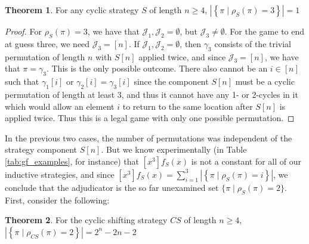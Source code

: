 \documentclass[article]{amsart}
\theoremstyle{definition}
\newtheorem{theorem}{Theorem}[section]
\theoremstyle{definition}
\theoremstyle{remark}
\begin{document}
\begin{theorem} \label{thm:rho3}
    For any cyclic strategy $S$ of length $n \geq 4$, $\left| \left\{ \pi \mid \rho_S(\pi) = 3 \right\} \right| = 1 $
\end{theorem}

\begin{proof}
For $\rho_S(\pi) = 3$, we have that $\mathcal{J}_1, \mathcal{J}_2 = \emptyset$, but $\mathcal{J}_3 \neq \emptyset$. For the game to end at guess three, we need $\mathcal{J}_3 = [n]$. If $\mathcal{J}_1, \mathcal{J}_2 = \emptyset$, then $\gamma_3$ consists of the trivial permutation of length $n$ with $S[n]$ applied twice, and since $\mathcal{J}_3 = [n]$, we have that $\pi = \gamma_3$. This is the only possible outcome. There also cannot be an $i \in [n]$ such that $\gamma_1[i]$ or $\gamma_2[i] = \gamma_3[i]$ since the component $S[n]$ must be a cyclic permutation of length at least 3, and thus it cannot have any 1- or 2-cycles in it which would allow an element $i$ to return to the same location after $S[n]$ is applied twice. Thus this is a legal game with only one possible permutation.
\end{proof}

In the previous two cases, the number of permutations was independent of the strategy component $S[n]$. But we know experimentally (in Table \ref{tab:gf_examples}, for instance) that $[x^3]f_S(x)$ is not a constant for all of our inductive strategies, and since $[x^3]f_S(x) = \sum_{i=1}^3 \left| \left\{ \pi \mid \rho_S(\pi) =i \right\} \right|$, we conclude that the adjudicator is the so far unexamined set $\{ \pi \mid \rho_S(\pi) = 2\}$. First, consider the following:

\begin{theorem} \label{thm:cs_rho2}
    For the cyclic shifting strategy $CS$ of length $n \geq 4$, $\left| \left\{ \pi \mid \rho_{CS}(\pi) = 2 \right\} \right| = 2^n - 2n - 2$
\end{theorem}
\end{document}

